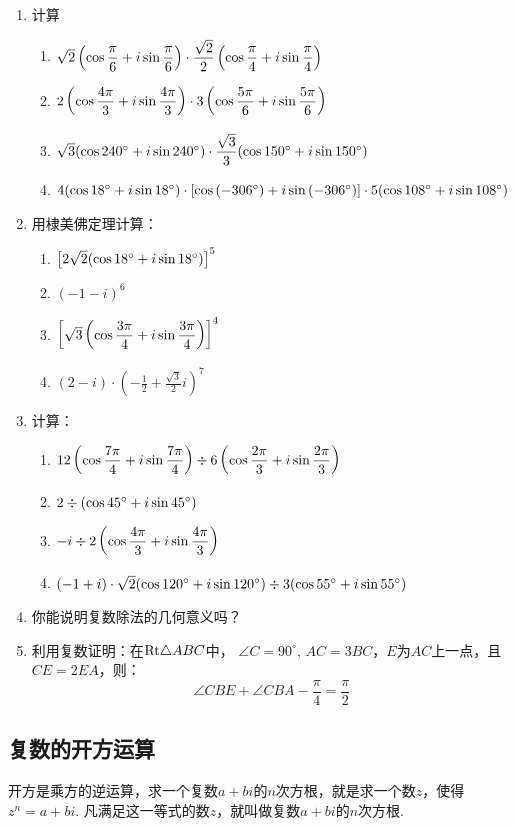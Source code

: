\begin{ex}
\begin{enumerate}
    \item 计算
\begin{enumerate}[(1)]
    \item $\sqrt{2}\left(\cos{\dfrac{\pi}{6}}+i\sin{\dfrac{\pi}{6}}\right)\cdot \dfrac{\sqrt{2}}{2}\left(\cos{\dfrac{\pi}{4}}+i\sin{\dfrac{\pi}{4}}\right)$
    \item $2\left(\cos{\dfrac{4\pi}{3}}+i\sin{\dfrac{4\pi}{3}}\right)\cdot 3\left(\cos{\dfrac{5\pi}{6}}+i\sin{\dfrac{5\pi}{6}}\right)$
    \item $\sqrt{3}(\cos{240^{\circ}}+i\sin{240^{\circ}})\cdot \dfrac{\sqrt{3}}{3}(\cos{150^{\circ}}+i\sin{150^{\circ}})$
    \item $4(\cos{18^{\circ}}+i\sin{18^{\circ}})\cdot [\cos\left(-306^{\circ}\right)+i\sin\left(-306^{\circ}\right)]\cdot 5(\cos{108^{\circ}}+i\sin{108^{\circ}})$
\end{enumerate}
\item 用棣美佛定理计算：
\begin{enumerate}[(1)]
    \item $\left[2\sqrt{2}(\cos{18^{\circ}}+i\sin{18^{\circ}})\right]^5$
    \item $(-1-i)^6$
    \item $\left[\sqrt{3}\left(\cos{\dfrac{3\pi}{4}}+i\sin{\dfrac{3\pi}{4}}\right)\right]^4$
    \item $(2-i)\cdot \left(-\frac{1}{2}+\frac{\sqrt{3}}{2}i\right)^7$
\end{enumerate}
\item 计算：
\begin{enumerate}[(1)]
    \item $12\left(\cos{\dfrac{7\pi}{4}}+i\sin{\dfrac{7\pi}{4}}\right)\div 6\left(\cos{\dfrac{2\pi}{3}}+i\sin{\dfrac{2\pi}{3}}\right)$
    \item $2\div (\cos{45^{\circ}}+i\sin{45^{\circ}})$
    \item $-i\div 2\left(\cos{\dfrac{4\pi}{3}}+i\sin{\dfrac{4\pi}{3}}\right)$
    \item $(-1+i)\cdot \sqrt{2}(\cos{120^{\circ}}+i\sin{120^{\circ}})\div 3(\cos{55^{\circ}}+i\sin{55^{\circ}})$
\end{enumerate}

\item 你能说明复数除法的几何意义吗？
\item 利用复数证明：在${\rm Rt}\triangle ABC$中，
$\angle C=90^{\circ}$, $AC=3BC$，$E$为$AC$上一点，且$CE=2EA$，则：
\[\angle CBE+\angle CBA-\frac{\pi}{4}=\frac{\pi}{2}\]
\end{enumerate}
\end{ex}

\subsection{复数的开方运算}
开方是乘方的逆运算，求一个复数$a+bi$的$n$次方根，就是求一个数$z$，使得$z^n=a+bi$. 凡满足这一等式的数$z$，就叫做复数$a+bi$的$n$次方根.

